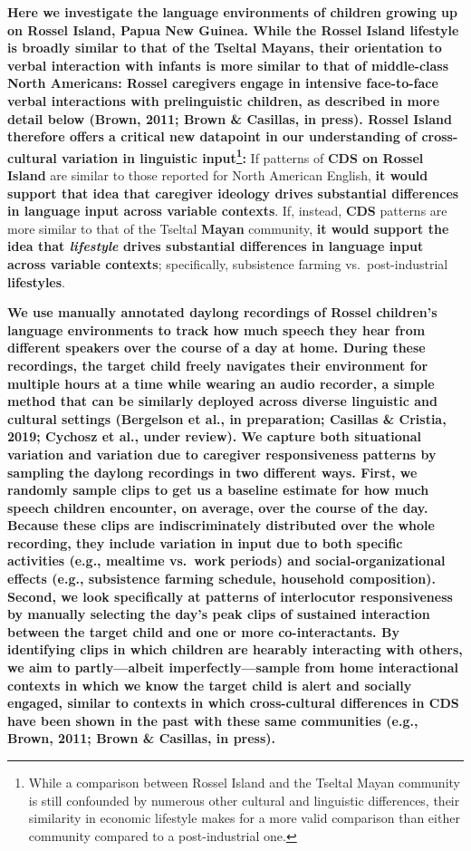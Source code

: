 \documentclass[,man,floatsintext]{apa6}
\begin{document}
\textbf{Here we investigate the language environments of children
growing up on Rossel Island, Papua New Guinea. While the Rossel Island
lifestyle is broadly similar to that of the Tseltal Mayans, their
orientation to verbal interaction with infants is more similar to that
of middle-class North Americans: Rossel caregivers engage in intensive
face-to-face verbal interactions with prelinguistic children, as
described in more detail below (Brown, 2011; Brown \& Casillas, in
press). Rossel Island therefore offers a critical new datapoint in our
understanding of cross-cultural variation in linguistic input\footnote{While
  a comparison between Rossel Island and the Tseltal Mayan community is
  still confounded by numerous other cultural and linguistic
  differences, their similarity in economic lifestyle makes for a more
  valid comparison than either community compared to a post-industrial
  one.}:} If patterns of \textbf{CDS on Rossel Island} are similar to
those reported for North American English, \textbf{it would support that
idea that caregiver ideology drives substantial differences in language
input across variable contexts}. If, instead, \textbf{CDS} patterns are
more similar to that of the Tseltal \textbf{Mayan} community, \textbf{it
would support the idea that \emph{lifestyle} drives substantial
differences in language input across variable contexts}; specifically,
subsistence farming vs.~post-industrial \textbf{lifestyles}.

\textbf{We use manually annotated daylong recordings of Rossel
children's language environments to track how much speech they hear from
different speakers over the course of a day at home. During these
recordings, the target child freely navigates their environment for
multiple hours at a time while wearing an audio recorder, a simple
method that can be similarly deployed across diverse linguistic and
cultural settings (Bergelson et al., in preparation; Casillas \&
Cristia, 2019; Cychosz et al., under review). We capture both
situational variation and variation due to caregiver responsiveness
patterns by sampling the daylong recordings in two different ways.
First, we randomly sample clips to get us a baseline estimate for how
much speech children encounter, on average, over the course of the day.
Because these clips are indiscriminately distributed over the whole
recording, they include variation in input due to both specific
activities (e.g., mealtime vs.~work periods) and social-organizational
effects (e.g., subsistence farming schedule, household composition).
Second, we look specifically at patterns of interlocutor responsiveness
by manually selecting the day's peak clips of sustained interaction
between the target child and one or more co-interactants. By identifying
clips in which children are hearably interacting with others, we aim to
partly---albeit imperfectly---sample from home interactional contexts in
which we know the target child is alert and socially engaged, similar to
contexts in which cross-cultural differences in CDS have been shown in
the past with these same communities (e.g., Brown, 2011; Brown \&
Casillas, in press).}
\end{document}

